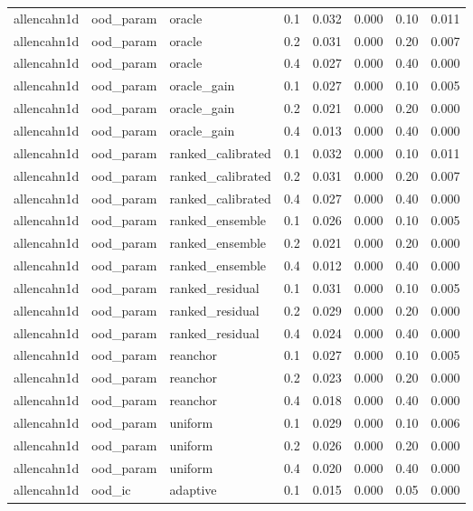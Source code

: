 \begin{tabular}{llllrrrr}
allencahn1d & ood\_param & oracle & 0.1 & 0.032 & 0.000 & 0.10 & 0.011 \\
allencahn1d & ood\_param & oracle & 0.2 & 0.031 & 0.000 & 0.20 & 0.007 \\
allencahn1d & ood\_param & oracle & 0.4 & 0.027 & 0.000 & 0.40 & 0.000 \\
allencahn1d & ood\_param & oracle\_gain & 0.1 & 0.027 & 0.000 & 0.10 & 0.005 \\
allencahn1d & ood\_param & oracle\_gain & 0.2 & 0.021 & 0.000 & 0.20 & 0.000 \\
allencahn1d & ood\_param & oracle\_gain & 0.4 & 0.013 & 0.000 & 0.40 & 0.000 \\
allencahn1d & ood\_param & ranked\_calibrated & 0.1 & 0.032 & 0.000 & 0.10 & 0.011 \\
allencahn1d & ood\_param & ranked\_calibrated & 0.2 & 0.031 & 0.000 & 0.20 & 0.007 \\
allencahn1d & ood\_param & ranked\_calibrated & 0.4 & 0.027 & 0.000 & 0.40 & 0.000 \\
allencahn1d & ood\_param & ranked\_ensemble & 0.1 & 0.026 & 0.000 & 0.10 & 0.005 \\
allencahn1d & ood\_param & ranked\_ensemble & 0.2 & 0.021 & 0.000 & 0.20 & 0.000 \\
allencahn1d & ood\_param & ranked\_ensemble & 0.4 & 0.012 & 0.000 & 0.40 & 0.000 \\
allencahn1d & ood\_param & ranked\_residual & 0.1 & 0.031 & 0.000 & 0.10 & 0.005 \\
allencahn1d & ood\_param & ranked\_residual & 0.2 & 0.029 & 0.000 & 0.20 & 0.000 \\
allencahn1d & ood\_param & ranked\_residual & 0.4 & 0.024 & 0.000 & 0.40 & 0.000 \\
allencahn1d & ood\_param & reanchor & 0.1 & 0.027 & 0.000 & 0.10 & 0.005 \\
allencahn1d & ood\_param & reanchor & 0.2 & 0.023 & 0.000 & 0.20 & 0.000 \\
allencahn1d & ood\_param & reanchor & 0.4 & 0.018 & 0.000 & 0.40 & 0.000 \\
allencahn1d & ood\_param & uniform & 0.1 & 0.029 & 0.000 & 0.10 & 0.006 \\
allencahn1d & ood\_param & uniform & 0.2 & 0.026 & 0.000 & 0.20 & 0.000 \\
allencahn1d & ood\_param & uniform & 0.4 & 0.020 & 0.000 & 0.40 & 0.000 \\
\midrule
allencahn1d & ood\_ic & adaptive & 0.1 & 0.015 & 0.000 & 0.05 & 0.000 \\

\end{tabular}
